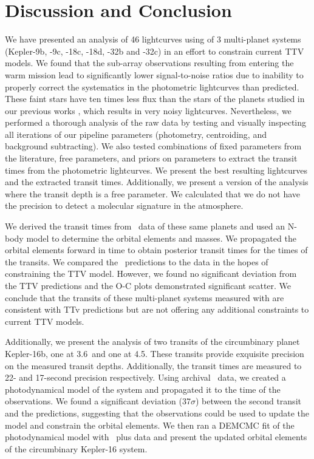\section{Discussion and Conclusion}

We have presented an analysis of 46 lightcurves using \spitzerIRAC of 3 multi-planet systems (Kepler-9b, -9c, -18c, -18d, -32b and -32c) in an effort to constrain current TTV models. We found that the sub-array observations resulting from \spitzer entering the warm mission lead to significantly lower signal-to-noise ratios due to inability to properly correct the systematics in the photometric lightcurves than predicted. These faint stars have ten times less flux than the stars of the planets studied in our previous works \citep[e.g., see][]{Baxter2021}, which results in very noisy lightcurves. Nevertheless, we performed a thorough analysis of the raw data by testing and visually inspecting all iterations of our pipeline parameters (photometry, centroiding, and background subtracting). We also tested combinations of fixed parameters from the literature, free parameters, and priors on parameters to extract the transit times from the photometric lightcurves. We present the best resulting lightcurves and the extracted transit times. Additionally, we present a version of the analysis where the transit depth is a free parameter. We calculated that we do not have the precision to detect a molecular signature in the atmosphere.

We derived the transit times from \Kepler~data of these same planets and used an N-body model to determine the orbital elements and masses. We propagated the orbital elements forward in time to obtain posterior transit times for the times of the \spitzer transits. We compared the \Kepler~predictions to the \spitzer data in the hopes of constraining the TTV model. However, we found no significant deviation from the TTV predictions and the O-C plots demonstrated significant scatter. We conclude that the transits of these multi-planet systems measured with \spitzerIRAC are consistent with TTv predictions but are not offering any additional constraints to current TTV models.

Additionally, we present the analysis of two \spitzer transits of the circumbinary planet Kepler-16b, one at 3.6\um~and one at 4.5\um. These transits provide exquisite precision on the measured transit depths. Additionally, the transit times are measured to 22- and 17-second precision respectively. Using archival \Kepler~data, we created a photodynamical model of the system and propagated it to the time of the \spitzer observations. We found a significant deviation (37$\sigma$) between the second \spitzer transit and the predictions, suggesting that the \spitzer observations could be used to update the model and constrain the orbital elements. We then ran a DEMCMC fit of the photodynamical model with \Kepler~plus \spitzer data and present the updated orbital elements of the circumbinary Kepler-16 system.

